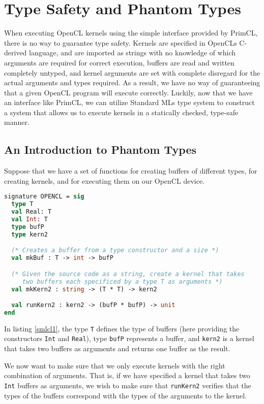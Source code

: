 \section{Type Safety and Phantom Types}

When executing OpenCL kernels using the simple interface provided by
PrimCL, there is no way to guarantee type safety. Kernels are
specified in OpenCLs C-derived language, and are imported as strings
with no knowledge of which arguments are required for correct
execution, buffers are read and written completely untyped, and kernel
arguments are set with complete disregard for the actual arguments and
types required. As a result, we have no way of guaranteeing that a
given OpenCL program will execute correctly. Luckily, now that we have
an interface like PrimCL, we can utilize Standard MLs type system to
construct a system that allows us to execute kernels in a statically
checked, type-safe manner.

\subsection{An Introduction to Phantom Types}

Suppose that we have a set of functions for creating buffers of
different types, for creating kernels, and for executing them on our
OpenCL device.

\begin{lstlisting}[language=ML, caption=Signatures for a primitive
    SmlCL module,label=smlcl1,mathescape]
signature OPENCL = sig
  type T
  val Real: T
  val Int: T
  type bufP
  type kern2

  (* Creates a buffer from a type constructor and a size *)
  val mkBuf : T -> int -> bufP

  (* Given the source code as a string, create a kernel that takes
     two buffers each specificed by a type T as arguments *)
  val mkKern2 : string -> (T * T) -> kern2

  val runKern2 : kern2 -> (bufP * bufP) -> unit
end
\end{lstlisting}

In listing \ref{smlcl1}, the type \texttt{T} defines the type of
buffers (here providing the constructors \texttt{Int} and
\texttt{Real}), type \texttt{bufP} represents a buffer, and
\texttt{kern2} is a kernel that takes two buffers as arguments and
returns one buffer as the result.

We now want to make sure that we only execute kernels with the right
combination of arguments. That is, if we have specified a kernel that
takes two \texttt{Int} buffers as arguments, we wish to make sure that
\texttt{runKern2} verifies that the types of the buffers correspond
with the types of the arguments to the kernel.

